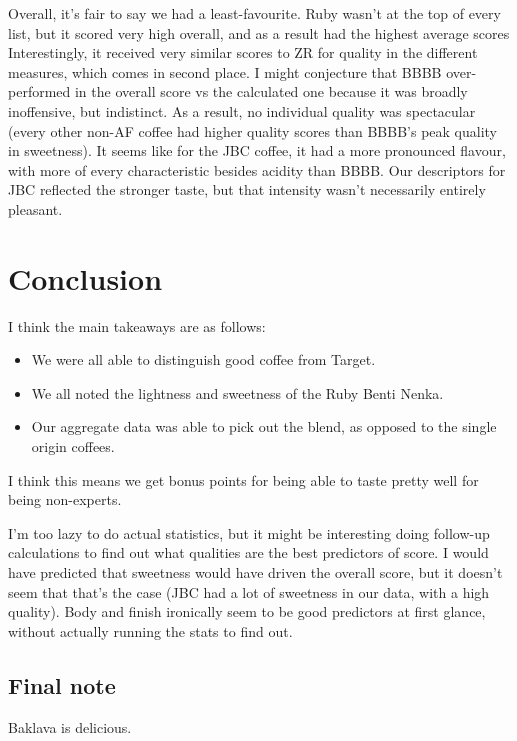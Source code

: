 \documentclass[12pt]{article}
\begin{document}
Overall, it's fair to say we had a least-favourite.
Ruby wasn't at the top of every list, but it scored very high overall, and as a result had the highest average scores
Interestingly, it received very similar scores to ZR for quality in the different measures,  which comes in second place.
I might conjecture that BBBB over-performed in the overall score vs the calculated one because it was broadly inoffensive, but indistinct.
As a result, no individual quality was spectacular (every other non-AF coffee had higher quality scores than BBBB's peak quality in sweetness).
It seems like for the JBC coffee, it had a more pronounced flavour, with more of every characteristic besides acidity than BBBB.
Our descriptors for JBC reflected the stronger taste, but that intensity wasn't necessarily entirely pleasant.

\section{Conclusion} \label{sec:Conclusions}
I think the main takeaways are as follows:
\begin{itemize}
	\item We were all able to distinguish good coffee from Target.
	\item We all noted the lightness and sweetness of the Ruby Benti Nenka.
	\item Our aggregate data was able to pick out the blend, as opposed to the single origin coffees.
\end{itemize}

I think this means we get bonus points for being able to taste pretty well for being non-experts.

I'm too lazy to do actual statistics, but it might be interesting doing follow-up calculations to find out what qualities are the best predictors of score.
I would have predicted that sweetness would have driven the overall score, but it doesn't seem that that's the case (JBC had a lot of sweetness in our data, with a high quality).
Body and finish ironically seem to be good predictors at first glance, without actually running the stats to find out.

\subsection{Final note} \label{subsec:finalnote}
Baklava is delicious.

\appendix
\end{document}
